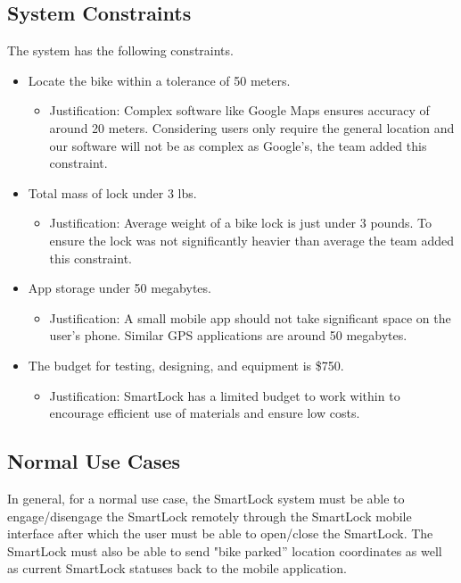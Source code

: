 \documentclass[12pt]{article}
\begin{document}
\subsection{System Constraints}

The system has the following constraints.

\begin{itemize}

\item Locate the bike within a tolerance of 50 meters.
	\begin{itemize}
		\item Justification: Complex software like Google Maps ensures accuracy of around 20 meters. Considering users only require the general location and our software will not be as complex as Google’s, the team added this constraint. 
	\end{itemize}

\item Total mass of lock under 3 lbs. 
	\begin{itemize} 
		\item Justification: Average weight of a bike lock is just under 3 pounds. To ensure the lock was not significantly heavier than average the team added this constraint.
	\end{itemize}

\item App storage under 50 megabytes. 
	\begin{itemize} 
		\item Justification: A small mobile app should not take significant space on the user's phone. Similar GPS applications are around 50 megabytes.
	\end{itemize}

\item The budget for testing, designing, and equipment is \$750.
	\begin{itemize}
		\item Justification: SmartLock has a limited budget to work within to encourage efficient use of materials and ensure low costs.
	\end{itemize} 

\end{itemize}

\subsection{Normal Use Cases}
In general, for a normal use case, the SmartLock system must be able to engage/disengage the SmartLock remotely through the SmartLock mobile interface after which the user must be able to open/close the SmartLock.  The SmartLock must also be able to send "bike parked” location coordinates as well as current SmartLock statuses back to the mobile application. 
\end{document}
